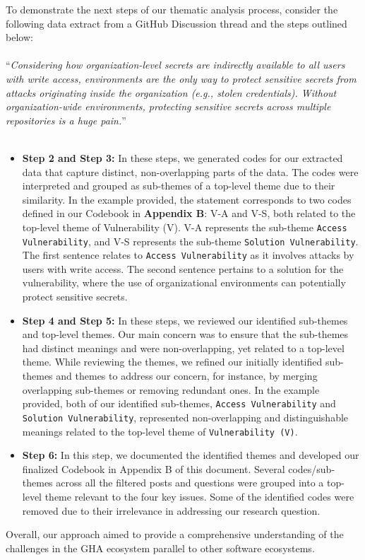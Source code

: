 \documentclass[conference]{IEEEtran}
\begin{document}
	To demonstrate the next steps of our thematic analysis process, consider the following data extract from a GitHub Discussion thread and the steps outlined below:\\\\
“\textit{Considering how organization-level secrets are indirectly available to all users with write access, environments are the only way to protect sensitive secrets from attacks originating inside the organization (e.g., stolen credentials). Without organization-wide environments, protecting sensitive secrets across multiple repositories is a huge pain.}”\\\\
 \begin{itemize}
\item \textbf{Step 2 and Step 3:}  In these steps, we generated codes for our extracted data that capture distinct, non-overlapping parts of the data. The codes were interpreted and grouped as sub-themes of a top-level theme due to their similarity. In the example provided, the statement corresponds to two codes defined in our Codebook in \textbf{Appendix B}: V-A and V-S, both related to the top-level theme of Vulnerability (V). V-A represents the sub-theme  \texttt{Access Vulnerability}, and V-S represents the sub-theme \texttt{Solution Vulnerability}. The first sentence relates to \texttt{Access Vulnerability} as it involves attacks by users with write access. The second sentence pertains to a solution for the vulnerability, where the use of organizational environments can potentially protect sensitive secrets.

\item \textbf{Step 4 and Step 5:} In these steps, we reviewed our identified sub-themes and top-level themes. Our main concern was to ensure that the sub-themes had distinct meanings and were non-overlapping, yet related to a top-level theme. While reviewing the themes, we refined our initially identified sub-themes and themes to address our concern, for instance, by merging overlapping sub-themes or removing redundant ones. In the example provided, both of our identified sub-themes, \texttt{Access Vulnerability} and \texttt{Solution Vulnerability}, represented non-overlapping and distinguishable meanings related to the top-level theme of \texttt{Vulnerability (V)}.

\item \textbf{Step 6:} In this step, we documented the identified themes and developed our finalized Codebook in Appendix B of this document. Several codes/sub-themes across all the filtered posts and questions were grouped into a top-level theme relevant to the four key issues. Some of the identified codes were removed due to their irrelevance in addressing our research question.
 \end{itemize}
Overall, our approach aimed to provide a comprehensive understanding of the challenges in the GHA ecosystem parallel to other software ecosystems.\\
\end{document}
